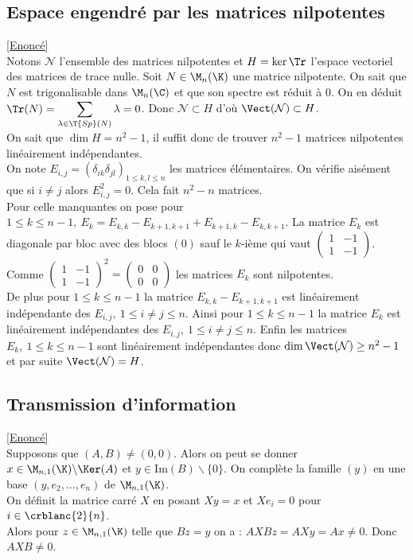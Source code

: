 \documentclass[8pt]{book}
\begin{document}
	\subsection{Espace engendré par les matrices nilpotentes }
	\label{Espace engendré par les matrices nilpotentes corrigé}
	\textcolor{blue}{\hyperref[Espace engendré par les matrices nilpotentes]{[Enoncé]}}\\
	Notons $\mathcal N$ l'ensemble des matrices nilpotentes et $H=\ker\Tr$ l'espace vectoriel des matrices de trace nulle.
	Soit $N\in \M_n(\K)$ une matrice nilpotente. On sait que $N$ est trigonalisable dans $\M_n(\C)$ et que son spectre est réduit à $0$. On en déduit $\Tr(N)=\displaystyle\sum_{\lambda\in \T{Sp}(N)}\lambda=0$. Donc $\mathcal N\subset H$ d'où $\Vect(\mathcal N)\subset H$.\\
	On sait que $\dim H=n^2-1$, il suffit donc de trouver $n^2-1$ matrices nilpotentes linéairement indépendantes.\\
	On note $E_{i,j}=(\delta_{ik}\delta_{jl})_{1\leq k,l\leq n}$ les matrices élémentaires. On vérifie aisément que si $i\ne j$ alors $E_{i,j}^2=0$. Cela fait $n^2-n$ matrices.\\
	Pour celle manquantes on pose pour $1\leq k\leq n-1,\ E_k=E_{k,k}-E_{k+1,k+1}+E_{k+1,k}-E_{k,k+1}$. La matrice $E_k$ est diagonale par bloc avec des blocs $(0)$ sauf le $k$-ième qui vaut $\begin{pmatrix}1&-1\\1&-1\end{pmatrix}$.\\
	Comme $\begin{pmatrix}1&-1\\1&-1\end{pmatrix}^2=\begin{pmatrix}0&0\\0&0\end{pmatrix}$ les matrices $E_k$ sont nilpotentes.\\
	De plus pour $1\leq k\leq n-1$ la matrice $E_{k,k}-E_{k+1,k+1}$ est linéairement indépendante des $E_{i,j},\ 1\leq i\ne j\leq n$. Ainsi pour $1\leq k\leq n-1$ la matrice $E_k$ est linéairement indépendantes des $E_{i,j},\ 1\leq i\ne j\leq n$. Enfin les matrices $E_k,\ 1\leq k\leq n-1$ sont linéairement indépendantes donc $\dim\Vect(\mathcal N)\geq n^2-1$ et par suite $\Vect(\mathcal N)=H$.
	
	\subsection{Transmission d'information }
	\label{Transmission d'information corrigé}
	\textcolor{blue}{\hyperref[Transmission d'information]{[Enoncé]}}\\
	Supposons que $(A,B)\ne (0,0)$. Alors on peut se donner $x\in \M_{n,1}(\K)\backslash\Ker(A)$ et $y\in \text{Im}(B)\backslash\{0\}$. On complète la famille $(y)$ en une base $(y,e_2,\dots,e_n)$ de $\M_{n,1}(\K)$.\\
	On définit la matrice carré $X$ en posant $Xy=x$ et $Xe_i=0$ pour $i\in \crblanc{2}{n}$.\\
	Alors pour $z\in \M_{n,1}(\K)$ telle que $Bz=y$ on a : $AXBz=AXy=Ax\ne 0$. Donc $AXB\ne 0$.
	
\end{document}
